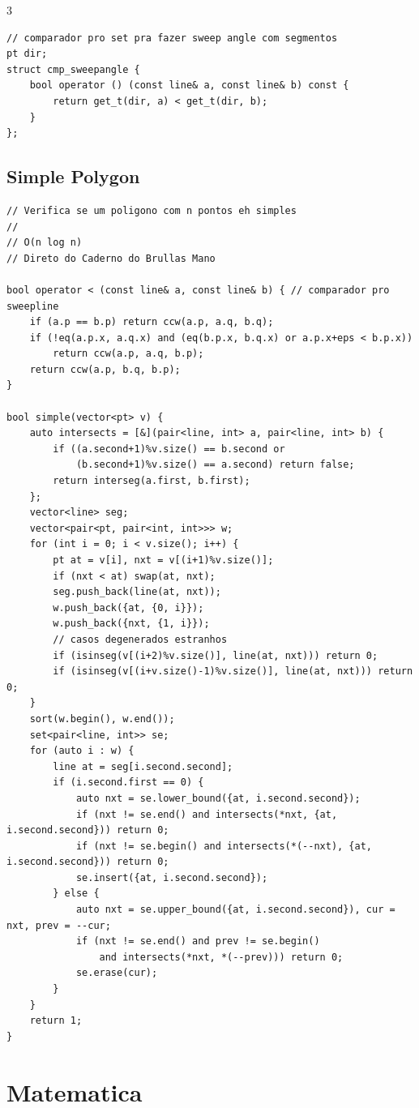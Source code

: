 \documentclass[9pt, a4paper, notitlepage]{extreport}
\begin{document}
\begin{multicols}{3}
\begin{verbatim}
// comparador pro set pra fazer sweep angle com segmentos
pt dir;
struct cmp_sweepangle {
    bool operator () (const line& a, const line& b) const {
        return get_t(dir, a) < get_t(dir, b);
    }
};
\end{verbatim}

\subsection{Simple Polygon}
\begin{verbatim}
// Verifica se um poligono com n pontos eh simples
//
// O(n log n)
// Direto do Caderno do Brullas Mano

bool operator < (const line& a, const line& b) { // comparador pro sweepline
	if (a.p == b.p) return ccw(a.p, a.q, b.q);
	if (!eq(a.p.x, a.q.x) and (eq(b.p.x, b.q.x) or a.p.x+eps < b.p.x))
		return ccw(a.p, a.q, b.p);
	return ccw(a.p, b.q, b.p);
}

bool simple(vector<pt> v) {
	auto intersects = [&](pair<line, int> a, pair<line, int> b) {
		if ((a.second+1)%v.size() == b.second or
			(b.second+1)%v.size() == a.second) return false;
		return interseg(a.first, b.first);
	};
	vector<line> seg;
	vector<pair<pt, pair<int, int>>> w;
	for (int i = 0; i < v.size(); i++) {
		pt at = v[i], nxt = v[(i+1)%v.size()];
		if (nxt < at) swap(at, nxt);
		seg.push_back(line(at, nxt));
		w.push_back({at, {0, i}});
		w.push_back({nxt, {1, i}});
		// casos degenerados estranhos
		if (isinseg(v[(i+2)%v.size()], line(at, nxt))) return 0;
		if (isinseg(v[(i+v.size()-1)%v.size()], line(at, nxt))) return 0;
	}
	sort(w.begin(), w.end());
	set<pair<line, int>> se;
	for (auto i : w) {
		line at = seg[i.second.second];
		if (i.second.first == 0) {
			auto nxt = se.lower_bound({at, i.second.second});
			if (nxt != se.end() and intersects(*nxt, {at, i.second.second})) return 0;
			if (nxt != se.begin() and intersects(*(--nxt), {at, i.second.second})) return 0;
			se.insert({at, i.second.second});
		} else {
			auto nxt = se.upper_bound({at, i.second.second}), cur = nxt, prev = --cur;
			if (nxt != se.end() and prev != se.begin()
				and intersects(*nxt, *(--prev))) return 0;
			se.erase(cur);
		}
	}
	return 1;
}
\end{verbatim}



%
%

\section{Matematica}


\end{multicols}
\end{document}
